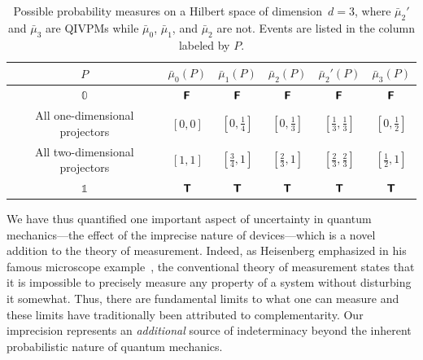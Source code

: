 \documentclass[english,reprint, aps, prl,superscriptaddress, showpacs,
showkeys, longbibliography, amsmath, amssymb, floatfix]{revtex4-1}
\theoremstyle{plain}
\theoremstyle{definition}
\newcommand{\imposs}{\textbf{\textsf{F}}}
\newcommand{\necess}{\textbf{\textsf{T}}}
\newcommand{\says}[3]{\begin{framed}\begin{minipage}{0.9\linewidth}\color{#1}{#2 says: #3}\end{minipage}\end{framed}}
\newcommand{\andy}[1]{\says{blue}{Andy}{#1}}
\begin{document}
\begin{table}
\caption{\label{tab:probability-measures}Possible probability measures on
a Hilbert space of dimension~$d=3$, where $\bar{\mu}_{2}'$ and
$\bar{\mu}_{3}$ are QIVPMs while $\bar{\mu}_{0}$, $\bar{\mu}_{1}$,
and $\bar{\mu}_{2}$ are not. Events are listed in the column labeled
by $P$.}
\centering{}%
\begin{tabular}{cccccc}
\toprule 
\addlinespace
$P$  & $\bar{\mu}_{0}\left(P\right)$ & $\bar{\mu}_{1}\left(P\right)$ & $\bar{\mu}_{2}\left(P\right)$ & $\bar{\mu}_{2}'\left(P\right)$ & $\bar{\mu}_{3}\left(P\right)$\tabularnewline
\midrule
\midrule 
\addlinespace
$\mathbb{0}$  & $\imposs$ & $\imposs$ & $\imposs$ & $\imposs$ & $\imposs$\tabularnewline
\midrule 
\addlinespace
All one-dimensional projectors  & $\left[0,0\right]$ & $\left[0,\tfrac{1}{4}\right]$ & $\left[0,\tfrac{1}{3}\right]$ & $\left[\tfrac{1}{3},\tfrac{1}{3}\right]$ & $\left[0,\tfrac{1}{2}\right]$\tabularnewline
\midrule 
\addlinespace
All two-dimensional projectors  & $\left[1,1\right]$ & $\left[\tfrac{3}{4},1\right]$ & $\left[\tfrac{2}{3},1\right]$ & $\left[\tfrac{2}{3},\tfrac{2}{3}\right]$ & $\left[\tfrac{1}{2},1\right]$\tabularnewline
\midrule 
\addlinespace
$\mathbb{1}$  & $\necess$ & $\necess$ & $\necess$ & $\necess$ & $\necess$\tabularnewline
\bottomrule
\end{tabular}
\end{table}

We have thus quantified one important aspect of uncertainty in quantum
mechanics---the effect of the imprecise nature of devices---which is a novel
addition to the theory of measurement. Indeed, as Heisenberg
emphasized in his famous microscope
example~\cite{Heisenberg1983apsrev4}, the conventional theory
of measurement states that it is impossible to precisely measure any
property of a system without disturbing it somewhat. Thus, there are
fundamental limits to what one can measure and these limits have traditionally 
been attributed to complementarity. Our imprecision represents an 
\emph{additional} source of indeterminacy beyond the inherent probabilistic nature
of quantum mechanics.
\end{document}
